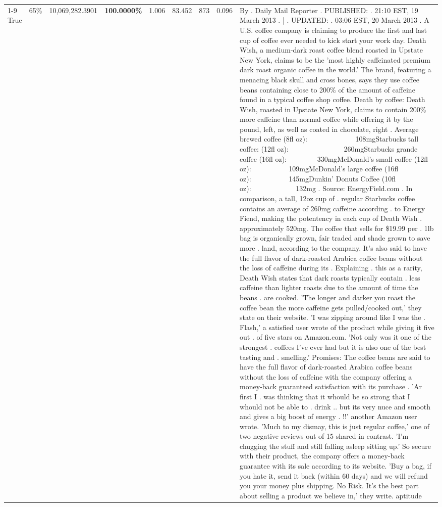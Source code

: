\begin{table}[H]
{\begin{tabular}{lllrlllll}
\cline{1-9} \cline{2-9}
True & 65\% & 10,069,282.3901 & \bfseries \color{red} 100.0000\% & 1.006 & 83.452 & 873 & 0.096 & By . Daily Mail Reporter . PUBLISHED: . 21:10 EST, 19 March 2013 . | . UPDATED: . 03:06 EST, 20 March 2013 . A U.S. coffee company is claiming to produce the first and last cup of coffee ever needed to kick start your work day. Death Wish, a medium-dark roast coffee blend roasted in Upstate New York, claims to be the 'most highly caffeinated premium dark roast organic coffee in the world.' The brand, featuring a menacing black skull and cross bones, says they use coffee beans containing close to 200\% of the amount of caffeine found in a typical coffee shop coffee. Death by coffee: Death Wish, roasted in Upstate New York, claims to contain 200\% more caffeine than normal coffee while offering it by the pound, left, as well as coated in chocolate, right . Average brewed coffee (8fl oz):              108mgStarbucks tall coffee: (12fl oz):                260mgStarbucks grande coffee (16fl oz):         330mgMcDonald's small coffee (12fl oz):           109mgMcDonald's large coffee (16fl oz):           145mgDunkin' Donuts Coffee (10fl oz):             132mg . Source: EnergyField.com . In comparison, a tall, 12oz cup of . regular Starbucks coffee contains an average of 260mg caffeine according . to Energy Fiend, making the potentency in each cup of Death Wish . approximately 520mg. The coffee that sells for \$19.99 per . 1lb bag is organically grown, fair traded and shade grown to save more . land, according to the company. It's also said to have the full flavor of dark-roasted Arabica coffee beans without the loss of caffeine during its . Explaining . this as a rarity, Death Wish states that dark roasts typically contain . less caffeine than lighter roasts due to the amount of time the beans . are cooked. 'The longer and darker you roast the coffee bean the more caffeine gets pulled/cooked out,' they state on their website. 'I was zipping around like I was the . Flash,' a satisfied user wrote of the product while giving it five out . of five stars on Amazon.com. 'Not only was it one of the strongest . coffees I've ever had but it is also one of the best tasting and . smelling.’ Promises: The coffee beans are said to have the full flavor of dark-roasted Arabica coffee beans without the loss of caffeine with the company offering a money-back guaranteed satisfaction with its purchase . 'Ar first I . was thinking that it whould be so strong that I whould not be able to . drink .. but its very nuce and smooth and gives a big boost of energy . !!' another Amazon user wrote. 'Much to my dismay, this is just regular coffee,' one of two negative reviews out of 15 shared in contrast. 'I'm chugging the stuff and still falling asleep sitting up.' So secure with their product, the company offers a money-back guarantee with its sale according to its website. 'Buy a bag, if you hate it, send it back (within 60 days) and we will refund you your money plus shipping. No Risk. It’s the best part about selling a product we believe in,' they write. aptitude \\

\end{tabular}}
\end{table}
